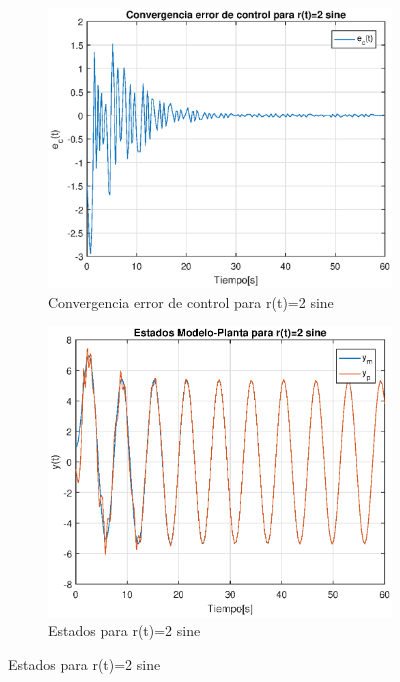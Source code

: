  \begin{figure}
  \begin{subfigure}[b]{0.4\textwidth}
    \includegraphics[width=\textwidth]{error_sine2.eps}
    \caption{Convergencia error de control para r(t)=2 sine}
    \label{fig:error_sine2}
  \end{subfigure}
  \begin{subfigure}[b]{0.4\textwidth}
    \includegraphics[width=\textwidth]{estados_sine2.eps}
    \caption{Estados para r(t)=2 sine}
    \label{fig:est_sine2}
  \end{subfigure}
\end{figure}

